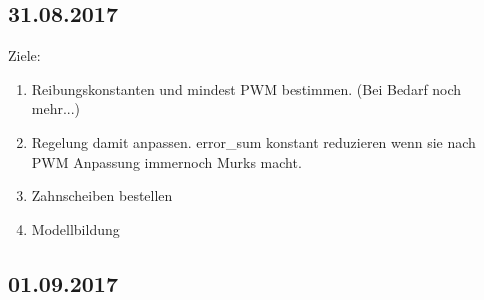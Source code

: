 \documentclass[fontsize=12pt,a4paper,parskip]{scrartcl}
\begin{document}
\subsection*{31.08.2017}

Ziele:
\begin{enumerate}
        \item Reibungskonstanten und mindest PWM bestimmen. (Bei Bedarf noch mehr...)
        \item Regelung damit anpassen. error\_sum konstant reduzieren wenn sie nach PWM Anpassung immernoch Murks macht.
        \item Zahnscheiben bestellen
        \item Modellbildung
\end{enumerate}
\subsection*{01.09.2017}
\end{document}
